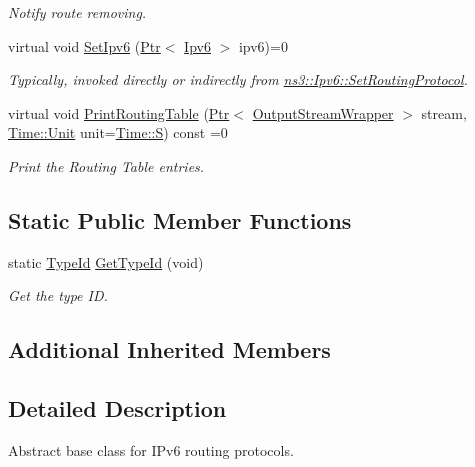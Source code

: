 \begin{DoxyCompactItemize}
\begin{DoxyCompactList}\small\item\em Notify route removing. \end{DoxyCompactList}\item 
virtual void \hyperlink{classns3_1_1Ipv6RoutingProtocol_ab97e8194b12a2db1d1374fc881974903}{Set\+Ipv6} (\hyperlink{classns3_1_1Ptr}{Ptr}$<$ \hyperlink{classns3_1_1Ipv6}{Ipv6} $>$ ipv6)=0
\begin{DoxyCompactList}\small\item\em Typically, invoked directly or indirectly from \hyperlink{classns3_1_1Ipv6_aa889d2174527a1df773d65974de83f8f}{ns3\+::\+Ipv6\+::\+Set\+Routing\+Protocol}. \end{DoxyCompactList}\item 
virtual void \hyperlink{classns3_1_1Ipv6RoutingProtocol_a2d5f8412f903a1365a1e84c06ad3da43}{Print\+Routing\+Table} (\hyperlink{classns3_1_1Ptr}{Ptr}$<$ \hyperlink{classns3_1_1OutputStreamWrapper}{Output\+Stream\+Wrapper} $>$ stream, \hyperlink{classns3_1_1Time_a87a7f4d29c68b047a72d291ad660295a}{Time\+::\+Unit} unit=\hyperlink{classns3_1_1Time_a87a7f4d29c68b047a72d291ad660295aade8622b06524a328cd3a59db6ccf76af}{Time\+::S}) const =0
\begin{DoxyCompactList}\small\item\em Print the Routing Table entries. \end{DoxyCompactList}\end{DoxyCompactItemize}
\subsection*{Static Public Member Functions}
\begin{DoxyCompactItemize}
\item 
static \hyperlink{classns3_1_1TypeId}{Type\+Id} \hyperlink{classns3_1_1Ipv6RoutingProtocol_a31d3d99b29f8852cbb732f0922c57e35}{Get\+Type\+Id} (void)
\begin{DoxyCompactList}\small\item\em Get the type ID. \end{DoxyCompactList}\end{DoxyCompactItemize}
\subsection*{Additional Inherited Members}


\subsection{Detailed Description}
Abstract base class for I\+Pv6 routing protocols. 

